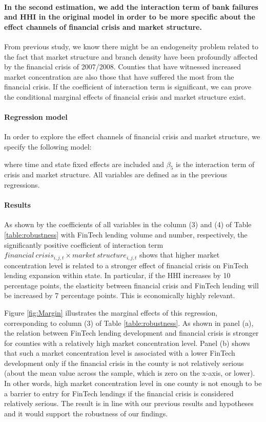 \documentclass[11pt, a4paper, leqno]{article}
\begin{document}
\paragraph{In the second estimation, we add the interaction term of bank failures and HHI in the original model in order to be more specific about the effect channels of financial crisis and market structure.} 
From previous study, we know there might be an endogeneity problem related to the fact that market structure and branch density have been profoundly affected by the financial crisis of 2007/2008. Counties that have witnessed increased market concentration are also those that have suffered the most from the financial crisis. If the coefficient of interaction term is significant, we can prove the conditional marginal effects of financial crisis and market structure exist.

\paragraph{Regression model} 
In order to explore the effect channels of financial crisis and market structure, we specify the following model:

where time and state fixed effects are included and $\beta_5$ is the interaction term of crisis and market structure. All variables are defined as in the previous regressions.

\paragraph{Results}
As shown by the coefficients of all variables in the column (3) and (4) of Table \ref{table:robustness} with FinTech lending volume and number, respectively, the significantly positive coefficient of interaction term $financial\ crisis_{i,j,t} \times  market\ structure_{i,j,t}$ shows that higher market concentration level is related to a stronger effect of financial crisis on FinTech lending expansion within state. In particular, if the HHI increases by 10 percentage points, the elasticity between financial crisis and FinTech lending will be increased by 7 percentage points. This is economically highly relevant. 

Figure \ref{fig:Margin} illustrates the marginal effects of this regression, corresponding to column (3) of Table \ref{table:robustness}. As shown in panel (a), the relation between FinTech lending development and financial crisis is stronger for counties with a relatively high market concentration level. Panel (b) shows that such a market concentration level is associated with a lower FinTech development only if the financial crisis in the county is not relatively serious (about the mean value across the sample, which is zero on the x-axis, or lower). In other words, high market concentration level in one county is not enough to be a barrier to entry for FinTech lendings if the financial crisis is considered relatively serious. The result is in line with our previous results and hypotheses and it would support the robustness of our findings.
\end{document}
